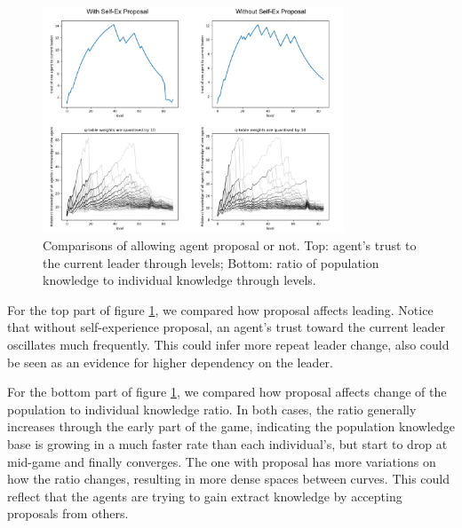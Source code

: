 \begin{figure}[!ht]
    \centering
    \includegraphics[width=0.8\textwidth]{008_team_5_agent_design/images/knowledgeAgg.png}
    \caption{Comparisons of allowing agent proposal or not. Top: agent's trust to the current leader through levels; Bottom: ratio of population knowledge to individual knowledge through levels.}
    \label{fig:knowledgeAgg}
\end{figure}
\pagebreak
For the top part of figure \ref{fig:knowledgeAgg}, we compared how proposal affects leading. Notice that without self-experience proposal, an agent's trust toward the current leader oscillates much frequently. This could infer more repeat leader change, also could be seen as an evidence for higher dependency on the leader.

For the bottom part of figure \ref{fig:knowledgeAgg}, we compared how proposal affects change of the population to individual knowledge ratio. In both cases, the ratio generally increases through the early part of the game, indicating the population knowledge base is growing in a much faster rate than each individual's, but start to drop at mid-game and finally converges. The one with proposal has more variations on how the ratio changes, resulting in more dense spaces between curves. This could reflect that the agents are trying to gain extract knowledge by accepting proposals from others.




